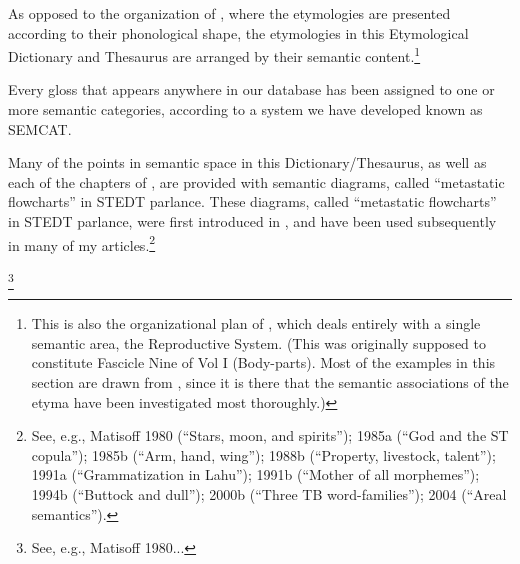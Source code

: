 As opposed to the organization of \textit{}, where the etymologies are presented according to their phonological shape, the etymologies in this Etymological Dictionary and Thesaurus are arranged by their semantic content.\footnote{This is also the organizational plan of \textit{}, which deals entirely with a single semantic area, the Reproductive System. (This was originally supposed to constitute Fascicle Nine of Vol I (Body-parts). Most of the examples in this section are drawn from \textit{}, since it is there that the semantic associations of the etyma have been investigated most thoroughly.)}

 Every gloss that appears anywhere in our database has been assigned to one or more semantic categories, according to a system we have developed known as SEMCAT.

Many of the points in semantic space in this Dictionary/Thesaurus, as well as each of the chapters of \textit{}, are provided with semantic diagrams, called “metastatic flowcharts” in STEDT parlance. These diagrams, called
“metastatic flowcharts” in STEDT parlance, were first introduced in \textit{},
and have been used subsequently in many of my articles.\footnote{See, e.g.,
Matisoff 1980 (“Stars, moon, and spirits”); 1985a (“God and the ST copula”);
1985b (“Arm, hand, wing”); 1988b (“Property, livestock, talent”); 1991a
(“Grammatization in Lahu”); 1991b (“Mother of all morphemes”); 1994b (“Buttock
and dull”); 2000b (“Three TB word-families”); 2004 (“Areal semantics”).}

\footnote{See, e.g., Matisoff 1980...} 

